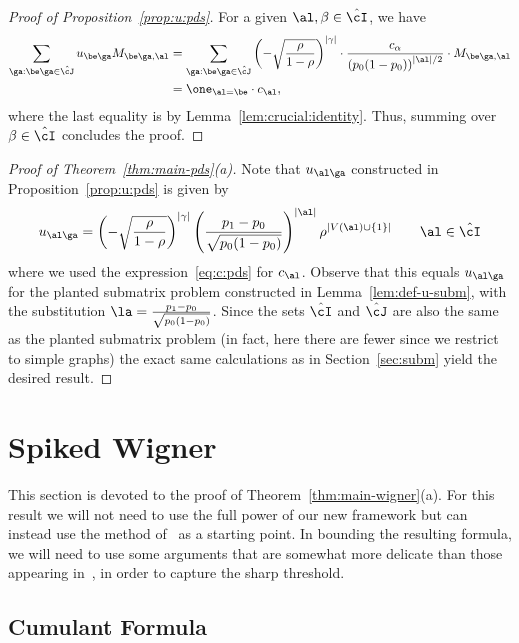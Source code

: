 \documentclass[11pt]{article}
\begin{document}
\begin{proof}[Proof of Proposition~\ref{prop:u:pds}]
For a given $\al, \beta\in \hat\cI$, we have
   \[
   \begin{split}
   \sum_{\ga: \be\ga\in \hat\cJ}u_{\be \ga}M_{\be \ga,\al}
   &=\sum_{\ga: \be\ga\in \hat\cJ}\left(-\sqrt{\frac{\rho}{1-\rho}}\right)^{|\gamma|} \cdot \frac{c_\alpha}{\left(p_0(1-p_0)\right)^{|\al|/2}}\cdot M_{\be\ga,\al}\\
   &=\one_{\al=\be}\cdot c_\al,
   \end{split}
   \]
   where the last equality is by Lemma~\ref{lem:crucial:identity}. Thus, summing over $\beta \in \hat\cI$ concludes the proof.
\end{proof}
\begin{proof}[Proof of Theorem~\ref{thm:main-pds}(a)]
    Note that $u_{\al\ga}$ constructed in Proposition~\ref{prop:u:pds} is given by
    \[
    u_{\al\ga}=\left(-\sqrt{\frac{\rho}{1-\rho}}\right)^{|\gamma|} \left(\frac{p_1-p_0}{\sqrt{p_0(1-p_0)}}\right)^{|\al|}\rho^{|V(\al)\cup\{1\}|} \qquad \al\in \hat\cI
    \]
    where we used the expression~\eqref{eq:c:pds} for $c_{\al}$. Observe that this equals $u_{\al\ga}$ for the planted submatrix problem constructed in Lemma~\ref{lem:def-u-subm}, with the substitution $\la=\frac{p_1-p_0}{\sqrt{p_0(1-p_0)}}$. Since the sets $\hat\cI$ and $\hat\cJ$ are also the same as the planted submatrix problem (in fact, here there are fewer since we restrict to simple graphs) the exact same calculations as in Section~\ref{sec:subm} yield the desired result. 
\end{proof}





\section{Spiked Wigner}
\label{sec:wigner}

This section is devoted to the proof of Theorem~\ref{thm:main-wigner}(a). For this result we will not need to use the full power of our new framework but can instead use the method of~\cite{SW-estimation} as a starting point. In bounding the resulting formula, we will need to use some arguments that are somewhat more delicate than those appearing in~\cite{SW-estimation}, in order to capture the sharp threshold.

\subsection{Cumulant Formula}
\end{document}
